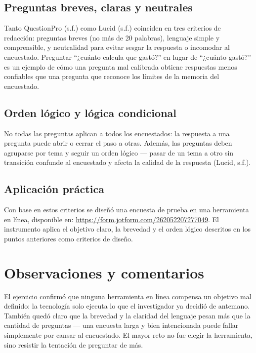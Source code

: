 \documentclass[
  spanish,
  12pt,
  letterpaper,
]{article}
\begin{document}
\subsection{Preguntas breves, claras y
neutrales}\label{preguntas-breves-claras-y-neutrales}

Tanto QuestionPro (s.f.) como Lucid (s.f.) coinciden en tres criterios
de redacción: preguntas breves (no más de 20 palabras), lenguaje simple
y comprensible, y neutralidad para evitar sesgar la respuesta o
incomodar al encuestado. Preguntar ``¿cuánto calcula que gastó?'' en
lugar de ``¿cuánto gastó?'' es un ejemplo de cómo una pregunta mal
calibrada obtiene respuestas menos confiables que una pregunta que
reconoce los límites de la memoria del encuestado.

\subsection{Orden lógico y lógica
condicional}\label{orden-luxf3gico-y-luxf3gica-condicional}

No todas las preguntas aplican a todos los encuestados: la respuesta a
una pregunta puede abrir o cerrar el paso a otras. Además, las preguntas
deben agruparse por tema y seguir un orden lógico --- pasar de un tema a
otro sin transición confunde al encuestado y afecta la calidad de la
respuesta (Lucid, s.f.).

\subsection{Aplicación práctica}\label{aplicaciuxf3n-pruxe1ctica}

Con base en estos criterios se diseñó una encuesta de prueba en una
herramienta en línea, disponible en:
\url{https://form.jotform.com/262052207277049}. El instrumento aplica el
objetivo claro, la brevedad y el orden lógico descritos en los puntos
anteriores como criterios de diseño.

\section{Observaciones y comentarios}\label{observaciones-y-comentarios}

El ejercicio confirmó que ninguna herramienta en línea compensa un
objetivo mal definido: la tecnología solo ejecuta lo que el investigador
ya decidió de antemano. También quedó claro que la brevedad y la
claridad del lenguaje pesan más que la cantidad de preguntas --- una
encuesta larga y bien intencionada puede fallar simplemente por cansar
al encuestado. El mayor reto no fue elegir la herramienta, sino resistir
la tentación de preguntar de más.
\end{document}
